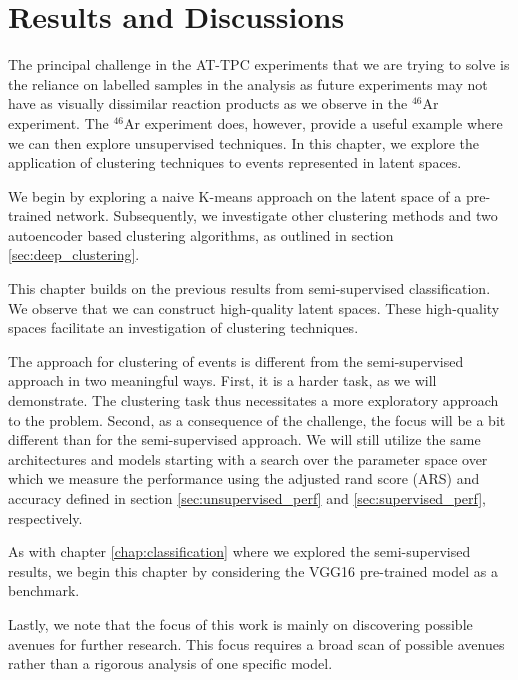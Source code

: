 \documentclass[preprint,12pt]{elsarticle}
\begin{document}
\section{Results and Discussions}\label{sec:results}
The principal challenge in the AT-TPC experiments that we are trying to solve is the reliance on labelled samples in the analysis as future experiments may not have as visually dissimilar reaction products  as we observe in the ${}^{46}$Ar experiment.  The  ${}^{46}$Ar experiment does, however, provide a useful example where we can then explore unsupervised techniques. In this chapter, we explore the application of clustering techniques to events represented in latent spaces. 

We begin by exploring a naive K-means approach on the latent space of a pre-trained network. Subsequently, we investigate other clustering methods and two autoencoder based clustering algorithms, as outlined in section \ref{sec:deep_clustering}.

This chapter builds on the previous results from semi-supervised classification. We observe that we can construct high-quality latent spaces. These high-quality spaces facilitate an investigation of clustering techniques. 

The approach for clustering of events is different from the semi-supervised approach in two meaningful ways. First, it is a harder task, as we will demonstrate. The clustering task thus necessitates a more exploratory approach to the problem. Second, as a consequence of the challenge, the focus will be a bit different than for the semi-supervised approach. We will still utilize the same architectures and models starting with a search over the parameter space over which we measure the performance using the adjusted rand score (ARS) and accuracy defined in section \ref{sec:unsupervised_perf} and \ref{sec:supervised_perf}, respectively.

As with chapter  \ref{chap:classification} where we explored the semi-supervised results, we begin this chapter by considering the VGG16 pre-trained model as a benchmark.

Lastly, we note that the focus of this work is mainly on discovering possible avenues for further research. This focus requires a broad scan of possible avenues rather than a rigorous analysis of one specific model.
\end{document}
